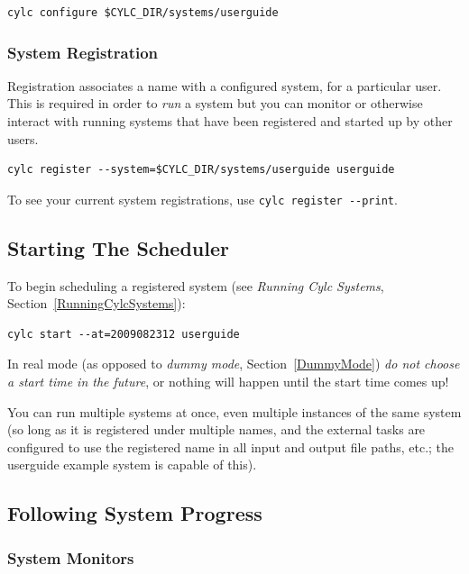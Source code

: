 \documentclass[11pt,a4paper]{article}
\begin{document}
\begin{lstlisting}
cylc configure $CYLC_DIR/systems/userguide
\end{lstlisting}

\subsubsection{System Registration}
\label{QuickSystemRegistration}

Registration associates a name with a configured system, for a
particular user. This is required in order to {\em run} a system but you
can monitor or otherwise interact with running systems that have been
registered and started up by other users.

\begin{lstlisting}
cylc register --system=$CYLC_DIR/systems/userguide userguide 
\end{lstlisting}

To see your current system registrations, use 
\lstinline=cylc register --print=.

\subsection{Starting The Scheduler}
\label{QuickStartingTheScheduler}

To begin scheduling a registered system (see {\em Running Cylc Systems},
Section~\ref{RunningCylcSystems}):

\begin{lstlisting}
cylc start --at=2009082312 userguide
\end{lstlisting}

In real mode (as opposed to {\em dummy mode}, Section~\ref{DummyMode})
{\em do not choose a start time in the future}, or nothing will happen
until the start time comes up!

You can run multiple systems at once, even multiple instances of the
same system (so long as it is registered under multiple names, and the
external tasks are configured to use the registered name in all input
and output file paths, etc.; the userguide example system is capable of
this). 

\subsection{Following System Progress}
\label{QuickFollowingSystemProgress}

\subsubsection{System Monitors}
\label{QuickSystemMonitors}
\end{document}
